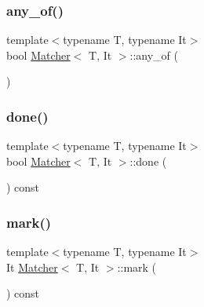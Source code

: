 \mbox{\label{class_matcher_a6cfab4944429c85a33d872691e0976c8}} 
\subsubsection{\texorpdfstring{any\+\_\+of()}{any\_of()}\hspace{0.1cm}{\footnotesize\ttfamily [2/2]}}
{\footnotesize\ttfamily template$<$typename T, typename It$>$ \\
bool \hyperlink{class_matcher}{Matcher}$<$ T, It $>$\+::any\+\_\+of (\begin{DoxyParamCaption}{ }\end{DoxyParamCaption})\hspace{0.3cm}{\ttfamily [inline]}}

\mbox{\label{class_matcher_afb8b791024067df37631ce67dcd4c656}} 
\subsubsection{\texorpdfstring{done()}{done()}}
{\footnotesize\ttfamily template$<$typename T, typename It$>$ \\
bool \hyperlink{class_matcher}{Matcher}$<$ T, It $>$\+::done (\begin{DoxyParamCaption}{ }\end{DoxyParamCaption}) const\hspace{0.3cm}{\ttfamily [inline]}}

\mbox{\label{class_matcher_af9135752ac195a21c230267d52db6623}} 
\subsubsection{\texorpdfstring{mark()}{mark()}}
{\footnotesize\ttfamily template$<$typename T, typename It$>$ \\
It \hyperlink{class_matcher}{Matcher}$<$ T, It $>$\+::mark (\begin{DoxyParamCaption}{ }\end{DoxyParamCaption}) const\hspace{0.3cm}{\ttfamily [inline]}}

